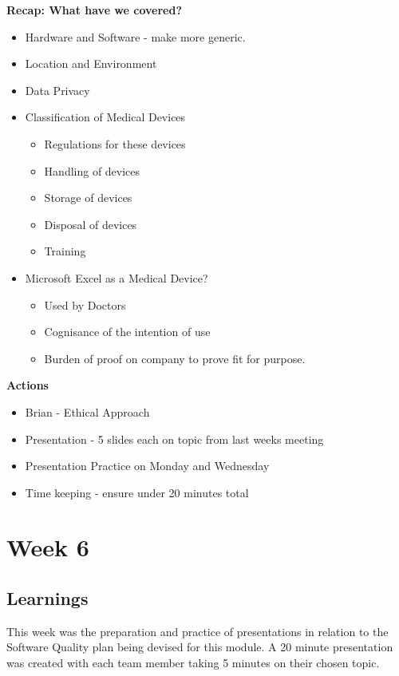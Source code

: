 \textbf{Recap: What have we covered?}
\begin{itemize}
\item Hardware and Software - make more generic.
\item Location and Environment
\item Data Privacy
\item Classification of Medical Devices
\begin{itemize}
\item Regulations for these devices
\item Handling of devices
\item Storage of devices
\item Disposal of devices
\item Training
\end{itemize}
\item Microsoft Excel as a Medical Device?
\begin{itemize}
\item Used by Doctors
\item Cognisance of the intention of use
\item Burden of proof on company to prove fit for purpose.
\end{itemize}
\end{itemize}

\textbf{Actions}
\begin{itemize}
\item Brian - Ethical Approach
\item Presentation - 5 slides each on topic from last weeks meeting
\item Presentation Practice on Monday and Wednesday
\item Time keeping - ensure under 20 minutes total
\end{itemize}


\chapter{Week 6}

\section{Learnings}

This week was the preparation and practice of presentations in relation to the Software Quality plan being devised for this module. A 20 minute presentation was created with each team member taking 5 minutes on their chosen topic. 

